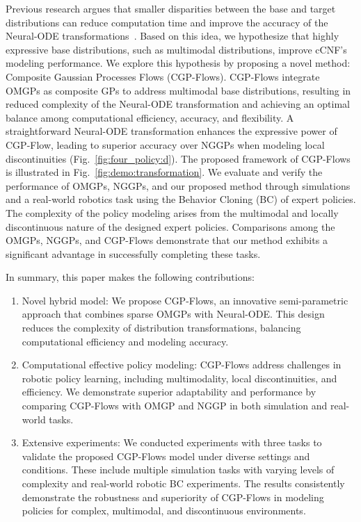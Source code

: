 \documentclass[sn-mathphys-num]{sn-jnl}
\begin{document}
Previous research argues that smaller disparities between the base and target distributions can reduce computation time and improve the accuracy of the Neural-ODE transformations~\cite{grathwohl2018ffjord}.
Based on this idea, we hypothesize that highly expressive base distributions, such as multimodal distributions, improve cCNF's modeling performance.
We explore this hypothesis by proposing a novel method: Composite Gaussian Processes Flows (CGP-Flows). 
CGP-Flows integrate OMGPs as composite GPs to address multimodal base distributions, resulting in reduced complexity of the Neural-ODE transformation and achieving an optimal balance among computational efficiency, accuracy, and flexibility.
A straightforward Neural-ODE transformation enhances the expressive power of CGP-Flow, leading to superior accuracy over NGGPs when modeling local discontinuities (Fig.~\ref{fig:four_policy:d}).
The proposed framework of CGP-Flows is illustrated in Fig.~\ref{fig:demo:transformation}.
We evaluate and verify the performance of OMGPs, NGGPs, and our proposed method through simulations and a real-world robotics task using the Behavior Cloning (BC) \cite{osa2018} of expert policies.
The complexity of the policy modeling arises from the multimodal and locally discontinuous nature of the designed expert policies. Comparisons among the OMGPs, NGGPs, and CGP-Flows demonstrate that our method exhibits a significant advantage in successfully completing these tasks.


In summary, this paper makes the following contributions:

\begin{enumerate}[label=(\arabic*)]
    \item Novel hybrid model: We propose CGP-Flows, an innovative semi-parametric approach that combines sparse OMGPs with Neural-ODE. This design reduces the complexity of distribution transformations, balancing computational efficiency and modeling accuracy.
    \item Computational effective policy modeling: CGP-Flows address challenges in robotic policy learning, including multimodality, local discontinuities, and efficiency. We demonstrate superior adaptability and performance by comparing CGP-Flows with OMGP and NGGP in both simulation and real-world tasks.
    \item Extensive experiments: We conducted experiments with three tasks to validate the proposed CGP-Flows model under diverse settings and conditions. These include multiple simulation tasks with varying levels of complexity and real-world robotic BC experiments. The results consistently demonstrate the robustness and superiority of CGP-Flows in modeling policies for complex, multimodal, and discontinuous environments.
\end{enumerate}
\end{document}
